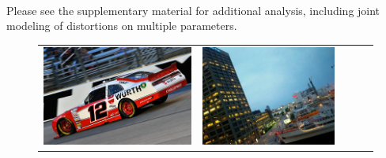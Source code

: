 \paragraph{}Please see the supplementary material for additional analysis, including joint modeling of distortions on multiple parameters.


\newcommand{\retrievalwidth}{0.12}
\begin{figure}[!ht]
\centering
\footnotesize
\setlength{\tabcolsep}{3pt}
\begin{tabular}{c|cccc}
\includegraphics[height=\retrievalwidth\linewidth]{figures/applications/matching_horizon_group_3/00021396_jpg_0_46409649747812576_original.jpg} &
\includegraphics[height=\retrievalwidth\linewidth]{figures/applications/matching_horizon_group_3/00016279_jpg_0_07618561060718712.jpg} &

\end{tabular}
\end{figure}
